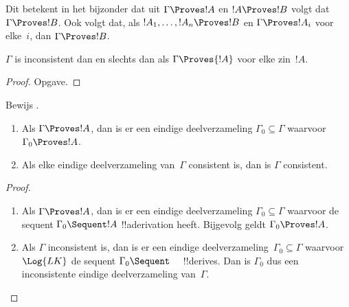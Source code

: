 \documentclass[openany]{memoir}
\begin{document}
Dit betekent in het bijzonder dat uit $\Gamma \Proves !A$ en $!A
\Proves !B$ volgt dat $\Gamma \Proves !B$. Ook volgt dat, als $!A_1,
\dots, !A_n \Proves !B$ en $\Gamma \Proves !A_i$ voor elke~$i$, dan
$\Gamma \Proves !B$.

\begin{prop}
$\Gamma$ is inconsistent dan en slechts dan als $\Gamma \Proves {!A}$
voor elke zin~$!A$.
\end{prop}

\begin{proof}
Opgave.
\end{proof}

\begin{prob}
Bewijs .
\end{prob}

\begin{prop}[Compactheid]
  \begin{enumerate}
  \item Als $\Gamma \Proves !A$, dan is er een eindige deelverzameling
    $\Gamma_0 \subseteq \Gamma$ waarvoor $\Gamma_0 \Proves !A$.
  \item Als elke eindige deelverzameling van~$\Gamma$ consistent is,
    dan is $\Gamma$ consistent.
  \end{enumerate}
\end{prop}

\begin{proof}
  \begin{enumerate}
    \item Als $\Gamma \Proves !A$, dan is er een eindige
      deelverzameling $\Gamma_0 \subseteq \Gamma$ waarvoor de sequent
      $\Gamma_0 \Sequent !A$ !!a{derivation} heeft. Bijgevolg geldt
      $\Gamma_0 \Proves !A$.
    \item Als $\Gamma$ inconsistent is, dan is er een eindige
      deelverzameling~$\Gamma_0 \subseteq \Gamma$ waarvoor $\Log{LK}$
      de sequent $\Gamma_0 \Sequent \quad$ !!{derive}s. Dan is
      $\Gamma_0$ dus een inconsistente eindige deelverzameling
      van~$\Gamma$.
  \end{enumerate}
\end{proof}
\endgroup

\begingroup
\def\olfilename{OLP-0078}
\def\olfilepath{content/first-order-logic/sequent-calculus/}
\hypertarget{unit-OLP-0078}{}
\end{document}

